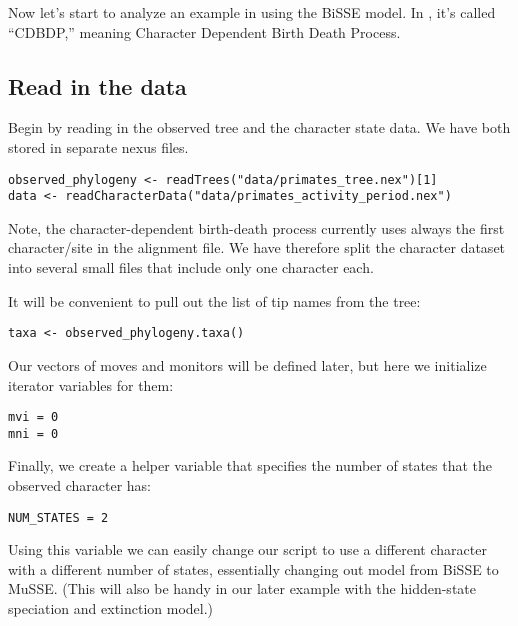 Now let's start to analyze an example in \RevBayes using the BiSSE model.
In \RevBayes, it's called ``CDBDP,'' meaning Character Dependent Birth Death Process.

\subsection{Read in the data}

Begin by reading in the observed tree and the character state data.
We have both stored in separate nexus files.
{\tt \begin{snugshade*}
\begin{lstlisting}
observed_phylogeny <- readTrees("data/primates_tree.nex")[1]
data <- readCharacterData("data/primates_activity_period.nex")
\end{lstlisting}
\end{snugshade*}}
Note, the character-dependent birth-death process currently uses always the first character/site in the alignment file.
We have therefore split the character dataset into several small files that include only one character each.

It will be convenient to pull out the list of tip names from the tree:
{\tt \begin{snugshade*}
\begin{lstlisting}
taxa <- observed_phylogeny.taxa()
\end{lstlisting}
\end{snugshade*}}

Our vectors of moves and monitors will be defined later, but here we initialize iterator variables for them:
{\tt \begin{snugshade*}
\begin{lstlisting}
mvi = 0
mni = 0
\end{lstlisting}
\end{snugshade*}}

Finally, we create a helper variable that specifies the number of states that the observed character has:
{\tt \begin{snugshade*}
\begin{lstlisting}
NUM_STATES = 2
\end{lstlisting}
\end{snugshade*}}
Using this variable we can easily change our script to use a different character with a different number of states,
essentially changing out model from BiSSE to MuSSE.
(This will also be handy in our later example with the hidden-state speciation and extinction model.)

